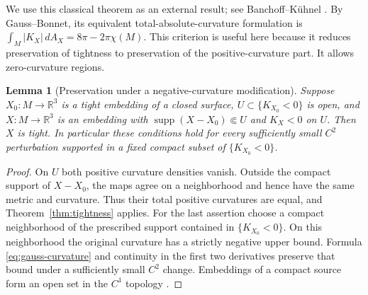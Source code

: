 \documentclass[11pt]{amsart}
\newtheorem{lemma}[theorem]{Lemma}
\theoremstyle{definition}
\newcommand{\R}{\mathbb R}
\DeclareMathOperator{\supp}{supp}
\begin{document}
We use this classical theorem as an external result; see
Banchoff--K\"uhnel \cite[Definition~1.1.1, p.~57]{BK}.
By Gauss--Bonnet, its equivalent
total-absolute-curvature formulation is
$\int_M|K_X|\,dA_X=8\pi-2\pi\chi(M)$.
This criterion is useful here because it reduces preservation of
tightness to preservation of the positive-curvature part. It allows
zero-curvature regions.

\begin{lemma}[Preservation under a negative-curvature modification]
\label{lem:tight-preservation}
Suppose $X_0:M\to\R^3$ is a tight embedding of a closed surface,
$U\subset\{K_{X_0}<0\}$ is open, and $X:M\to\R^3$ is an embedding
with $\supp(X-X_0)\Subset U$ and $K_X<0$ on $U$.
Then $X$ is tight.
In particular these conditions hold for every sufficiently small
$C^2$ perturbation supported in a fixed compact subset of
$\{K_{X_0}<0\}$.
\end{lemma}
\begin{proof}
On $U$ both positive curvature densities vanish. Outside the compact
support of $X-X_0$, the maps agree on a neighborhood and hence have
the same metric and curvature. Thus their total positive curvatures
are equal, and Theorem~\ref{thm:tightness} applies.
For the last assertion choose a compact neighborhood of the prescribed
support contained in $\{K_{X_0}<0\}$. On this neighborhood the original
curvature has a strictly negative upper bound. Formula
\eqref{eq:gauss-curvature} and continuity in the first two derivatives
preserve that bound under a sufficiently small $C^2$ change.
Embeddings of a compact source form an open set in the $C^1$
topology \cite[Chapter~2, \S1, Theorem~1.4]{Hirsch}.
\end{proof}
\end{document}
